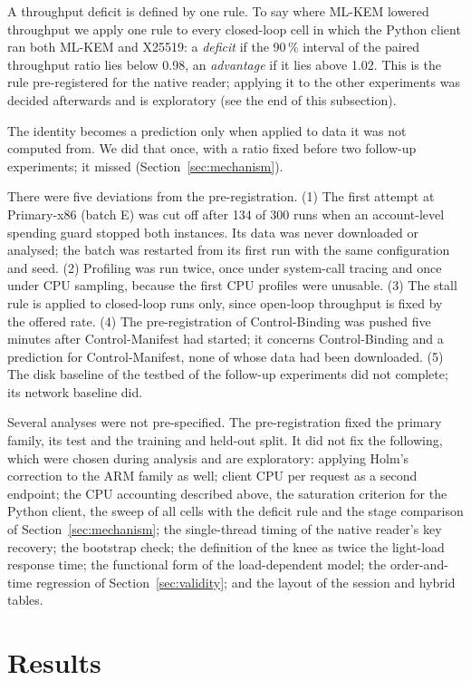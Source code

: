 \documentclass[review,12pt]{elsarticle}
\newcommand{\lab}[1]{\textsf{#1}}
\begin{document}
A throughput deficit is defined by one rule. To say where ML-KEM lowered throughput we apply
one rule to every closed-loop cell in which the Python client ran both ML-KEM and X25519: a
\emph{deficit} if the 90\,\% interval of the paired throughput ratio lies below 0.98, an
\emph{advantage} if it lies above 1.02. This is the rule pre-registered for the native reader;
applying it to the other experiments was decided afterwards and is exploratory
(see the end of this subsection).

The identity becomes a prediction only when applied to data it
was not computed from. We did that once, with a ratio fixed before two follow-up experiments;
it missed (Section~\ref{sec:mechanism}).

There were five deviations from the pre-registration.
(1) The first attempt at \lab{Primary-x86} (batch E) was cut off after 134 of 300 runs when an account-level spending
guard stopped both instances. Its data was never downloaded or analysed; the batch was restarted
from its first run with the same configuration and seed. (2) \lab{Profiling} was run twice,
once under system-call tracing and once under CPU sampling, because the first CPU profiles were
unusable. (3) The stall rule is applied to closed-loop runs only, since open-loop throughput is
fixed by the offered rate. (4) The pre-registration of \lab{Control-Binding} was pushed five minutes after
\lab{Control-Manifest} had started; it concerns \lab{Control-Binding} and a prediction for
\lab{Control-Manifest}, none of whose data had been downloaded. (5) The disk baseline of the
testbed of the follow-up experiments did not complete; its network baseline did.

Several analyses were not pre-specified. The pre-registration fixed the primary family, its test and the
training and held-out split. It did not fix the following, which were chosen during analysis and
are exploratory: applying Holm's correction to the ARM family as well; client CPU per request as a
second endpoint; the CPU accounting described above, the saturation criterion for
the Python client, the sweep of all cells with the deficit rule and the stage comparison of
Section~\ref{sec:mechanism};
the single-thread timing of the native reader's key recovery;
the bootstrap check; the definition of the knee as twice the light-load response time; the
functional form of the load-dependent model; the order-and-time regression of
Section~\ref{sec:validity}; and the layout of the session and hybrid tables.

\section{Results}\label{sec:results}
\end{document}

